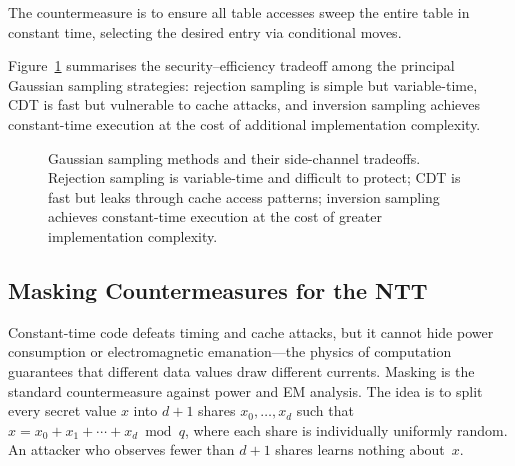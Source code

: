 The countermeasure is to ensure all table accesses sweep the entire table in constant time, selecting the desired entry via conditional moves.

Figure~\ref{fig:ch12-gaussian-sampling} summarises the security--efficiency tradeoff among the principal Gaussian sampling strategies: rejection sampling is simple but variable-time, CDT is fast but vulnerable to cache attacks, and inversion sampling achieves constant-time execution at the cost of additional implementation complexity.

\begin{figure}[t]
\centering
{}
\caption{Gaussian sampling methods and their side-channel tradeoffs.  Rejection sampling is variable-time and difficult to protect; CDT is fast but leaks through cache access patterns; inversion sampling achieves constant-time execution at the cost of greater implementation complexity.}
\label{fig:ch12-gaussian-sampling}
\end{figure}

\subsection{Masking Countermeasures for the NTT}
\label{subsec:masking-ntt}

Constant-time code defeats timing and cache attacks, but it cannot hide power consumption or electromagnetic emanation---the physics of computation guarantees that different data values draw different currents.  Masking is the standard countermeasure against power and EM analysis.  The idea is to split every secret value $x$ into $d+1$ shares $x_0, \ldots, x_d$ such that $x = x_0 + x_1 + \cdots + x_d \bmod q$, where each share is individually uniformly random.  An attacker who observes fewer than $d+1$ shares learns nothing about~$x$.

